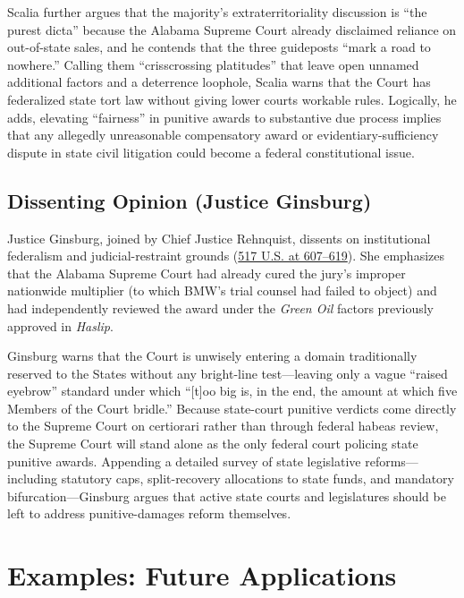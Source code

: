 \documentclass[12pt]{article}
\begin{document}
Scalia further argues that the majority's extraterritoriality discussion is ``the purest dicta'' because the Alabama Supreme Court already disclaimed reliance on out-of-state sales, and he contends that the three guideposts ``mark a road to nowhere.'' Calling them ``crisscrossing platitudes'' that leave open unnamed additional factors and a deterrence loophole, Scalia warns that the Court has federalized state tort law without giving lower courts workable rules. Logically, he adds, elevating ``fairness'' in punitive awards to substantive due process implies that any allegedly unreasonable compensatory award or evidentiary-sufficiency dispute in state civil litigation could become a federal constitutional issue.

\subsection{Dissenting Opinion (Justice Ginsburg)}

Justice Ginsburg, joined by Chief Justice Rehnquist, dissents on institutional federalism and judicial-restraint grounds (\href{https://supreme.justia.com/cases/federal/us/517/559/}{517 U.S. at 607--619}). She emphasizes that the Alabama Supreme Court had already cured the jury's improper nationwide multiplier (to which BMW's trial counsel had failed to object) and had independently reviewed the award under the \textit{Green Oil} factors previously approved in \textit{Haslip}.

Ginsburg warns that the Court is unwisely entering a domain traditionally reserved to the States without any bright-line test---leaving only a vague ``raised eyebrow'' standard under which ``[t]oo big is, in the end, the amount at which five Members of the Court bridle.'' Because state-court punitive verdicts come directly to the Supreme Court on certiorari rather than through federal habeas review, the Supreme Court will stand alone as the only federal court policing state punitive awards. Appending a detailed survey of state legislative reforms---including statutory caps, split-recovery allocations to state funds, and mandatory bifurcation---Ginsburg argues that active state courts and legislatures should be left to address punitive-damages reform themselves.

\section{Examples: Future Applications}
\end{document}
